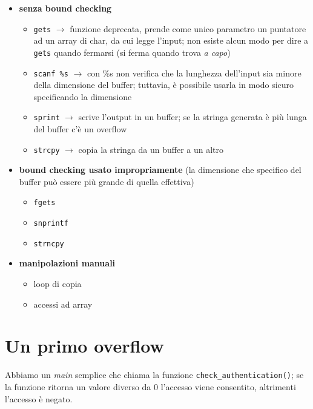 \begin{itemize}
    \item \textbf{senza bound checking}
    \begin{itemize}
        \item \texttt{gets} $\rightarrow$ funzione deprecata, prende come unico parametro un puntatore
        ad un array di char, da cui legge l'input; non esiste alcun modo per dire a \texttt{gets} quando fermarsi (si ferma quando trova \textit{a capo})
        \item \texttt{scanf \%s} $\rightarrow$ con \%s non verifica che la lunghezza dell'input sia minore della dimensione del buffer;
        tuttavia, è possibile usarla in modo sicuro specificando la dimensione
        \item \texttt{sprint} $\rightarrow$ scrive l'output in un buffer; se la stringa generata è più lunga del buffer c'è un overflow
        \item \texttt{strcpy} $\rightarrow$ copia la stringa da un buffer a un altro
    \end{itemize}
    \item \textbf{bound checking usato impropriamente} (la dimensione che specifico del buffer può essere 
    più grande di quella effettiva)
    \begin{itemize}
        \item \texttt{fgets}
        \item \texttt{snprintf}
        \item \texttt{strncpy}
    \end{itemize}
    \item \textbf{manipolazioni manuali}
    \begin{itemize}
        \item loop di copia
        \item accessi ad array
    \end{itemize}
\end{itemize}

\section{Un primo overflow}

Abbiamo un \textit{main} semplice che chiama la 
funzione \texttt{check\_authentication()}; se 
la funzione ritorna un valore diverso da 0 l'accesso viene consentito, altrimenti 
l'accesso è negato.

